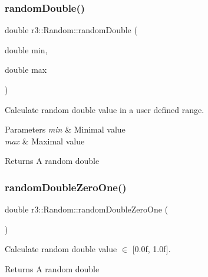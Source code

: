 \subsubsection{\texorpdfstring{random\+Double()}{randomDouble()}\hspace{0.1cm}{\footnotesize\ttfamily [2/2]}}
{\footnotesize\ttfamily double r3\+::\+Random\+::random\+Double (\begin{DoxyParamCaption}\item[{double}]{min,  }\item[{double}]{max }\end{DoxyParamCaption})\hspace{0.3cm}{\ttfamily [static]}}



Calculate random double value in a user defined range. 


\begin{DoxyParams}{Parameters}
{\em min} & Minimal value \\
\hline
{\em max} & Maximal value \\
\hline
\end{DoxyParams}
\begin{DoxyReturn}{Returns}
A random double 
\end{DoxyReturn}
\mbox{\label{classr3_1_1_random_a04e1db517c98c2ea6b75b7dfe8466ded}} 
\subsubsection{\texorpdfstring{random\+Double\+Zero\+One()}{randomDoubleZeroOne()}}
{\footnotesize\ttfamily double r3\+::\+Random\+::random\+Double\+Zero\+One (\begin{DoxyParamCaption}{ }\end{DoxyParamCaption})\hspace{0.3cm}{\ttfamily [static]}}



Calculate random double value $\in$ \mbox{[}0.\+0f, 1.\+0f\mbox{]}. 

\begin{DoxyReturn}{Returns}
A random double 
\end{DoxyReturn}
\mbox{\label{classr3_1_1_random_a3b1100f056013575372f2b1a362da39f}} 
